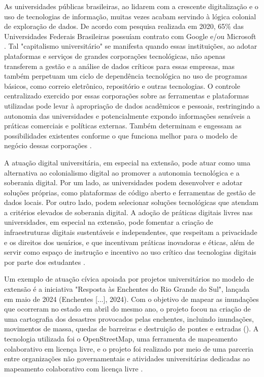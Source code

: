 \documentclass[portuguese]{textolivre}
\begin{document}
As universidades públicas brasileiras, ao lidarem com a crescente
digitalização e o uso de tecnologias de informação, muitas vezes acabam
servindo à lógica colonial de exploração de dados. De acordo com
pesquisa realizada em 2020, 65\% das Universidades Federais Brasileiras
possuíam contrato com Google e/ou Microsoft \cite{Mian2021}. Tal
"capitalismo universitário" \cite{Santos2018} se manifesta quando essas
instituições, ao adotar plataformas e serviços de grandes corporações
tecnológicas, não apenas transferem a gestão e a análise de dados
críticos para essas empresas, mas também perpetuam um ciclo de
dependência tecnológica no uso de programas básicos, como correio
eletrônico, repositório e outras tecnologias. O controle centralizado
exercido por essas corporações sobre as ferramentas e plataformas
utilizadas pode levar à apropriação de dados acadêmicos e pessoais,
restringindo a autonomia das universidades e potencialmente expondo
informações sensíveis a práticas comerciais e políticas externas. Também
determinam e engessam as possibilidades existentes conforme o que
funciona melhor para o modelo de negócio dessas corporações
\cite{Cassino2021}.

A atuação digital universitária, em especial na extensão, pode atuar
como uma alternativa ao colonialismo digital ao promover a autonomia
tecnológica e a soberania digital. Por um lado, as universidades podem
desenvolver e adotar soluções próprias, como plataformas de código
aberto e ferramentas de gestão de dados locais. Por outro lado, podem
selecionar soluções tecnológicas que atendam a critérios elevados de
soberania digital. A adoção de práticas digitais livres nas
universidades, em especial na extensão, pode fomentar a criação de
infraestruturas digitais sustentáveis e independentes, que respeitam a
privacidade e os direitos dos usuários, e que incentivam práticas
inovadoras e éticas, além de servir como espaço de instrução e incentivo
ao uso crítico das tecnologias digitais por parte dos estudantes
\cite{Mian2021}.

Um exemplo de atuação cívica apoiada por projetos universitários no
modelo de extensão é a iniciativa "Resposta às Enchentes do Rio Grande
do Sul", lançada em maio de 2024 (Enchentes {[}...{]}, 2024). Com o
objetivo de mapear as inundações que ocorreram no estado em abril do
mesmo ano, o projeto focou na criação de uma cartografia dos desastres
provocados pelas enchentes, incluindo inundações, movimentos de massa,
quedas de barreiras e destruição de pontes e estradas (). A
tecnologia utilizada foi o OpenStreetMap, uma ferramenta de mapeamento
colaborativo em licença livre, e o projeto foi realizado por meio de uma
parceria entre organizações não governamentais e atividades
universitárias dedicadas ao mapeamento colaborativo com licença livre
\cite{Souto2024}.
\end{document}
